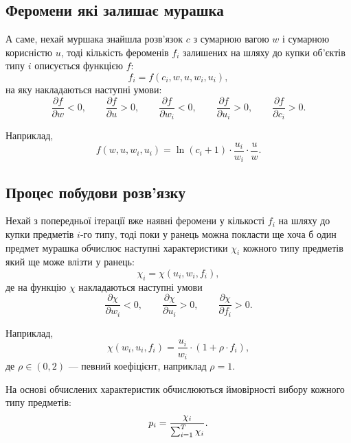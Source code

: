 \documentclass[a4paper, 12pt]{article}
\numberwithin{equation}{section}
\begin{document}
\subsection{Феромени які залишає мурашка}

А саме, нехай муршака знайшла розв'язок $c$ з сумарною вагою $w$ і сумарною корисністю $u$, тоді кількість фероменів $f_i$ залишених на шляху до купки об'єктів типу $i$ описується функцією $f$:
\begin{equation}
    f_i = f(c_i, w, u, w_i, u_i),
\end{equation}
на яку накладаються наступні умови:
\begin{equation}
    \frac{\partial f}{\partial w} < 0, \qquad
    \frac{\partial f}{\partial u} > 0, \qquad
    \frac{\partial f}{\partial w_i} < 0, \qquad
    \frac{\partial f}{\partial u_i} > 0, \qquad
    \frac{\partial f}{\partial c_i} > 0.
\end{equation}

Наприклад, 
\begin{equation}
    f(w, u, w_i, u_i) = \ln (c_i + 1) \cdot \frac{u_i}{w_i} \cdot \frac{u}{w}.
\end{equation}

\subsection{Процес побудови розв'язку}

Нехай з попередньої ітерації вже наявні феромени у кількості $f_i$ на шляху до купки предметів $i$-го типу, тоді поки у ранець можна покласти ще хоча б один предмет мурашка обчислює наступні характеристики $\chi_i$ кожного типу предметів який ще може влізти у ранець:
\begin{equation}
    \chi_i = \chi(u_i, w_i, f_i),
\end{equation}
де на функцію $\chi$ накладаються наступні умови
\begin{equation}
    \frac{\partial \chi}{\partial w_i} < 0, \qquad
    \frac{\partial \chi}{\partial u_i} > 0, \qquad
    \frac{\partial \chi}{\partial f_i} > 0.
\end{equation}

Наприклад,
\begin{equation}
    \chi(w_i, u_i, f_i) = \frac{u_i}{w_i} \cdot (1 + \rho \cdot f_i),
\end{equation}
де $\rho \in (0, 2)$ --- певний коефіцієнт, наприклад $\rho = 1$. \medskip

На основі обчислених характеристик обчислюються ймовірності вибору кожного типу предметів:
\begin{equation}
    p_i = \frac{\chi_i}{\operatorname*{\sum}_{i = 1}^T \chi_i}.
\end{equation}
\end{document}

